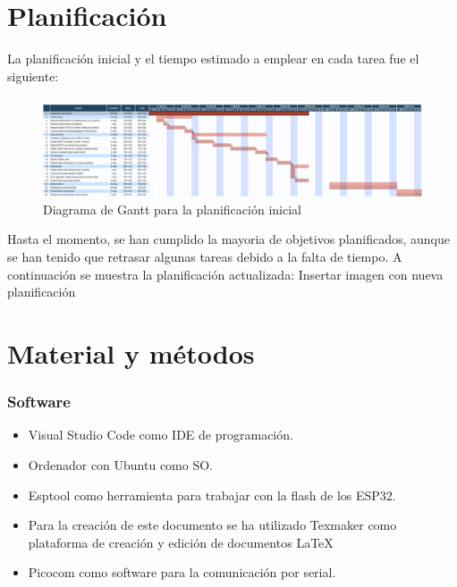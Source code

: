 \begin{titlepage}
\section{Planificación}
La planificación inicial y el tiempo estimado a emplear en cada tarea fue el siguiente:
\begin{figure}[h!]
	\centering
	\includegraphics[width=1\textwidth]{imagenes/gantt_inicial.PNG}
	\caption{Diagrama de Gantt para la planificación inicial}
\end{figure}
Hasta el momento, se han cumplido la mayoria de objetivos planificados, aunque se han tenido que retrasar algunas tareas debido a la falta de tiempo. A continuación se muestra la planificación actualizada:
Insertar imagen con nueva planificación

\section{Material y métodos}
\subsubsection{Software}
\begin{itemize}
	\item Visual Studio Code como IDE de programación.
	\item Ordenador con Ubuntu como SO.
	\item Esptool como herramienta para trabajar con la flash de los ESP32.
	\item Para la creación de este documento se ha utilizado Texmaker como plataforma de creación y edición de documentos \LaTeX
	\item Picocom como software para la comunicación por serial.
\end{itemize}


\end{titlepage}
